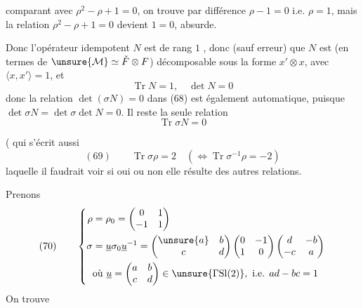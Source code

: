 comparant avec $\rho^2-\rho+1=0$, on trouve  par différence $\rho-1=0$ i.e. $\rho=1$, mais la relation $\rho^2-\rho+1=0$ devient $1=0$, absurde.

Donc l'opérateur idempotent $N$ est  de rang $1$ , donc  (sauf erreur)  que $N$ est  (en termes de $\unsure{\mathcal M}\simeq\check F\otimes F$)  décomposable sous la forme $x'\otimes x$, avec $\langle x,x'\rangle=1$, et 
\[
\operatorname{Tr}N=1,\quad\det N=0
\]
donc la relation $\det(\sigma N)=0$ dans (68) est également automatique, puisque $\det\sigma N=\det\sigma\det N=0$. Il reste la seule relation
\[
\operatorname{Tr}\sigma N=0
\]

(  qui s'écrit aussi
\[
(69)\qquad \operatorname{Tr}\sigma\rho=2\quad(\Longleftrightarrow\operatorname{Tr}\sigma^{-1}\rho=-2)
\]
 laquelle il faudrait voir si oui ou non elle résulte des autres relations.

Prenons
\[
(70)\qquad
\left\{\begin{aligned}
\rho&=\rho_0=\begin{pmatrix}0&1\\-1&1\end{pmatrix}\\
\sigma&=\underline u\sigma_0\underline u^{-1}
=\begin{pmatrix}\unsure{a}&b\\c&d\end{pmatrix}
\begin{pmatrix}0&-1\\1&0\end{pmatrix}
\begin{pmatrix}d&-b\\-c&a\end{pmatrix}\\
&\text{où }\underline u=\begin{pmatrix}a&b\\c&d\end{pmatrix}\in\unsure{\Gamma\mathrm{Sl}(2)},\text{ i.e. }ad-bc=1
\end{aligned}\right.
\]
On trouve


